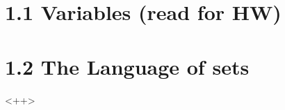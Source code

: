 \documentclass{article}
\begin{document}
\section{1.1 Variables (read for HW)}


\section{1.2 The Language of sets}
\begin{equation}


\end{equation}<++>
\end{document}
